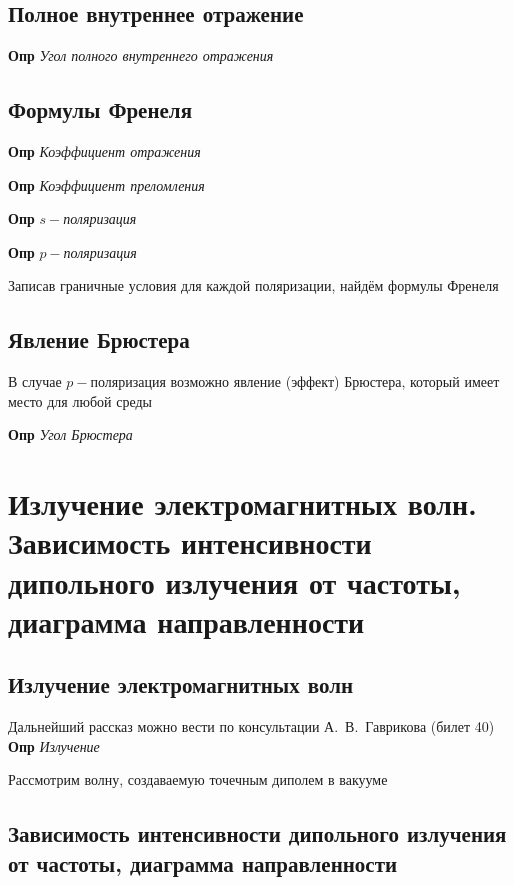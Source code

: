 \documentclass[a4paper, 14pt]{article}
\begin{document}
    \subsection{Полное внутреннее отражение}
    
    \textbf{Опр} \textit{Угол полного внутреннего отражения}
    
    \subsection{Формулы Френеля}
    
    \textbf{Опр} \textit{Коэффициент отражения}
    
    \textbf{Опр} \textit{Коэффициент преломления}
    
    \textbf{Опр} \textit{$s-$поляризация}
    
    \textbf{Опр} \textit{$p-$поляризация}
    
    Записав граничные условия для каждой поляризации, найдём формулы Френеля
    
    \subsection{Явление Брюстера}
    
    В случае $p-$поляризация возможно явление (эффект) Брюстера, который имеет место для любой среды
    
    \textbf{Опр} \textit{Угол Брюстера}
    
    \section{Излучение электромагнитных волн.
    Зависимость интенсивности дипольного излучения от частоты, диаграмма направленности}
    
    \subsection{Излучение электромагнитных волн}
    
    Дальнейший рассказ можно вести по консультации А.~В.~Гаврикова (билет 40) \\
    
    \textbf{Опр} \textit{Излучение}
    
    Рассмотрим волну, создаваемую точечным диполем в вакууме
    
    \subsection{Зависимость интенсивности дипольного излучения от частоты, диаграмма направленности}
    
\end{document}
